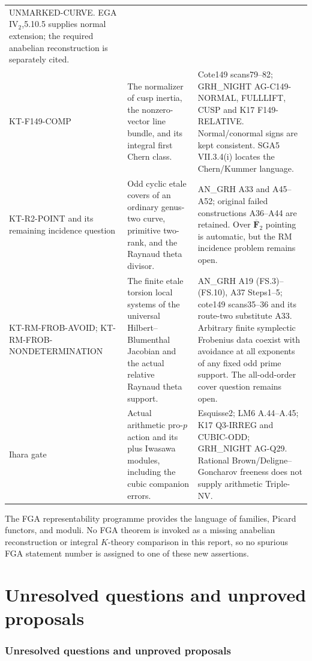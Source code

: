 \documentclass[11pt,a4paper]{article}
\theoremstyle{definition}
\begin{document}
\begin{longtable}{>{\raggedright\arraybackslash}p{}
>{\raggedright\arraybackslash}p{}
>{\raggedright\arraybackslash}p{}}
UNMARKED-CURVE. EGA IV$_2$,5.10.5 supplies normal extension;
the required anabelian reconstruction is separately cited.\\
KT-F149-COMP &
The normalizer of cusp inertia, the nonzero-vector line bundle,
and its integral first Chern class. &
Cote149 scans79--82; GRH\_NIGHT AG-C149-NORMAL, FULLLIFT,
CUSP and K17 F149-RELATIVE. Normal/conormal signs are kept
consistent. SGA5 VII.3.4(i) locates the Chern/Kummer language.\\
KT-R2-POINT and its remaining incidence question &
Odd cyclic etale covers of an ordinary genus-two curve,
primitive two-rank, and the Raynaud theta divisor. &
AN\_GRH A33 and A45--A52; original failed constructions
A36--A44 are retained. Over $\overline{\mathbf F}_2$ pointing
is automatic, but the RM incidence problem remains open.\\
KT-RM-FROB-AVOID; KT-RM-FROB-NONDETERMINATION &
The finite etale torsion local systems of the universal
Hilbert--Blumenthal Jacobian and the actual relative
Raynaud theta support. &
AN\_GRH A19 (FS.3)--(FS.10), A37 Steps1--5;
cote149 scans35--36 and its route-two substitute A33.
Arbitrary finite symplectic Frobenius data coexist with
avoidance at all exponents of any fixed odd prime support.
The all-odd-order cover question remains open.\\
Ihara gate &
Actual arithmetic pro-$p$ action and its plus Iwasawa modules,
including the cubic companion errors. &
Esquisse2; LM6 A.44--A.45; K17 Q3-IRREG and CUBIC-ODD;
GRH\_NIGHT AG-Q29. Rational Brown/Deligne--Goncharov
freeness does not supply arithmetic Triple-NV.\\
\bottomrule
\end{longtable}
\normalsize

The FGA representability programme provides the language of
families, Picard functors, and moduli. No FGA theorem is
invoked as a missing anabelian reconstruction or integral
$K$-theory comparison in this report, so no spurious FGA
statement number is assigned to one of these new assertions.


\part{Unresolved questions and unproved proposals}

\section{Unresolved questions and unproved proposals}
\end{document}
